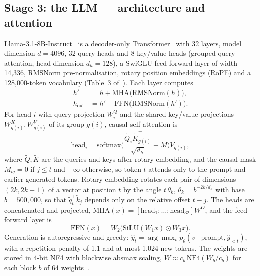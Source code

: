 \documentclass[conference]{IEEEtran}
\begin{document}
\subsection{Stage 3: the LLM --- architecture and attention}
Llama-3.1-8B-Instruct~\cite{dubey2024llama3} is a decoder-only Transformer~\cite{vaswani2017} with 32 layers,
model dimension $d=4096$, 32 query heads and 8 key/value heads (grouped-query attention, head dimension
$d_h=128$), a SwiGLU feed-forward layer of width 14,336, RMSNorm pre-normalisation, rotary position
embeddings (RoPE) and a 128,000-token vocabulary (Table~3 of~\cite{dubey2024llama3}). Each layer computes
\begin{align}
h' &= h + \mathrm{MHA}\big(\mathrm{RMSNorm}(h)\big), \\
h_{\text{out}} &= h' + \mathrm{FFN}\big(\mathrm{RMSNorm}(h')\big).
\end{align}
For head $i$ with query projection $W_i^Q$ and the shared key/value projections $W_{g(i)}^K, W_{g(i)}^V$ of
its group $g(i)$, causal self-attention is
\begin{equation}
\mathrm{head}_i = \mathrm{softmax}\!\Big(\frac{\tilde{Q}_i \tilde{K}_{g(i)}^{\top}}{\sqrt{d_h}} + M\Big) V_{g(i)},
\end{equation}
where $\tilde{Q}, \tilde{K}$ are the queries and keys after rotary embedding, and the causal mask
$M_{tj}=0$ if $j\le t$ and $-\infty$ otherwise, so token $t$ attends only to the prompt and earlier generated
tokens. Rotary embedding rotates each pair of dimensions $(2k, 2k{+}1)$ of a vector at position $t$ by the
angle $t\,\theta_k$, $\theta_k = b^{-2k/d_h}$ with base $b=500{,}000$, so that $\tilde{q}_t^{\top}\tilde{k}_j$ depends only on the
relative offset $t-j$. The heads are concatenated and projected,
$\mathrm{MHA}(x)=[\mathrm{head}_1;\dots;\mathrm{head}_{32}]W^O$, and the feed-forward layer is
\begin{equation}
\mathrm{FFN}(x) = W_2\big(\mathrm{SiLU}(W_1 x) \odot W_3 x\big).
\end{equation}
Generation is autoregressive and greedy:
$\hat{y}_t = \arg\max_v p_\theta(v \mid \text{prompt}, \hat{y}_{<t})$, with a repetition penalty of 1.1 and
at most 1,024 new tokens. The weights are stored in 4-bit NF4 with blockwise absmax scaling,
$W \approx c_b\,\mathrm{NF4}(W_b / c_b)$ for each block $b$ of 64 weights~\cite{dettmers2023qlora}.
\end{document}
